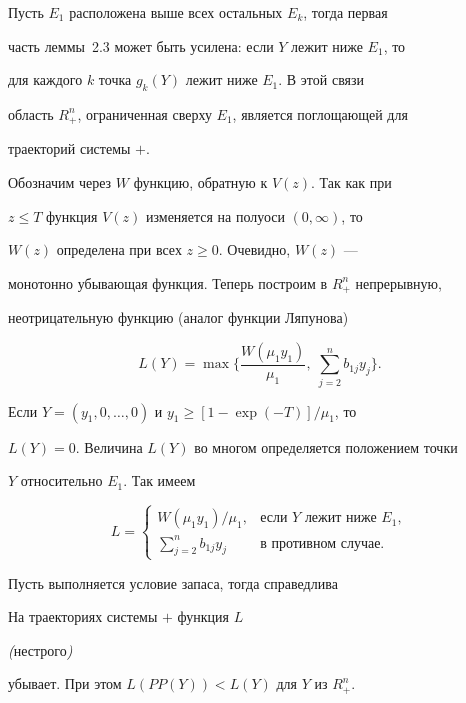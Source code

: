 Пусть $E_1$ расположена выше всех остальных $E_k$, тогда первая 


часть леммы~2.3 может быть усилена: если $Y$ лежит ниже $E_1$, то 


для каждого $k$ точка $g_k(Y)$ лежит ниже $E_1$. В этой связи 


область $R_+^n$, ограниченная сверху $E_1$, является поглощающей для 


траекторий системы $+$.





Обозначим через $W$ функцию, обратную к $V(z)$. Так как при 


$z\leqslant T$ функция $V(z)$ изменяется на полуоси $(0,\infty)$, то 


$W(z)$ определена при всех $z\geqslant 0$. Очевидно, $W(z)$ --- 


монотонно убывающая функция. Теперь построим в $R_+^n$ непрерывную, 


неотрицательную функцию (аналог функции Ляпунова)


$$


L(Y)=\max\biggl\{\frac{W(\mu_1y_1)}{\mu_1},\; \sum_{j=2}^n 


b_{1j}y_j\biggr\}.


$$


Если $Y=(y_1,0,\dotsc,0)$ и $y_1\geqslant[1-\exp(-T)]/\mu_1$, то 


$L(Y)=0$. Величина $L(Y)$ во многом определяется положением точки 


$Y$ относительно $E_1$. Так имеем


$$


L=


\begin{cases}


W(\mu_1y_1)/\mu_1, & \text{если $Y$ лежит ниже $E_1$},\\


\sum\limits_{j=2}^nb_{1j}y_j & \text{в противном случае}.


\end{cases}


$$





Пусть выполняется условие запаса, тогда справедлива





\begin{lems}%


На траекториях системы $+$ функция $L$ 


{\em (}нестрого{\em )}


убывает. При этом $L(PP(Y))<L(Y)$ для $Y$ из $R_+^n$.


\end{lems}%





